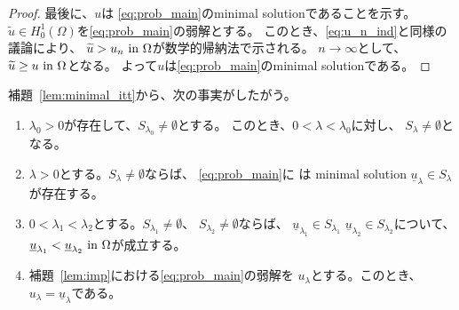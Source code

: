 \begin{proof}
 最後に、$u$は
 \ref{eq:prob_main}のminimal solutionであることを示す。
 $\tilde{u} \in H_0^1(\Omega)$を\ref{eq:prob_main}の弱解とする。
 このとき、\eqref{eq:u_n_ind}と同様の議論により、
 $\widetilde{u} > u_n ~\text{in}~ \Omega$が数学的帰納法で示される。
 $n \to \infty$として、$\widetilde{u} \geq u ~\text{in}~ \Omega$となる。
 よって$u$は\ref{eq:prob_main}のminimal solutionである。\qedhere
\end{proof}

補題~\ref{lem:minimal_itt}から、次の事実がしたがう。

\begin{lem} \label{lem:minimal_va}
 \begin{enumerate}[1.]
  \item $\lambda_0 > 0$が存在して、$S_{\lambda_0} \neq \emptyset$とする。
        このとき、$0 < \lambda < \lambda_0$に対し、
        $S_\lambda \neq \emptyset$となる。
  \item $\lambda > 0$とする。$S_\lambda \neq \emptyset$ならば、
        \ref{eq:prob_main}に
        は minimal solution $\underline{u}_\lambda
        \in S_\lambda$が存在する。
  \item $0 < \lambda_1 < \lambda_2$とする。$S_{\lambda_1} \neq
        \emptyset$、
        $S_{\lambda_2} \neq \emptyset$ならば、
        $\underline{u}_{\lambda_1} \in S_{\lambda_1}$
        $\underline{u}_{\lambda_2} \in S_{\lambda_2}$について、
        $\underline{u}_{\lambda_1} < \underline{u}_{\lambda_2} ~\text{in}~
        \Omega$が成立する。
  \item 補題~\ref{lem:imp}における\ref{eq:prob_main}の弱解を
        $u_\lambda$とする。このとき、$u_\lambda =
        \underline{u}_\lambda$である。
 \end{enumerate}
\end{lem}


